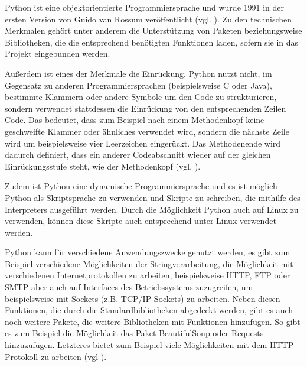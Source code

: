 Python ist eine objektorientierte Programmiersprache und wurde 1991 in der ersten Version von Guido van Rossum veröffentlicht (vgl. \cite{.05.03.2017}). Zu den technischen Merkmalen gehört unter anderem die Unterstützung von Paketen beziehungsweise Bibliotheken, die die entsprechend benötigten Funktionen laden, sofern sie in das Projekt eingebunden werden. 

Außerdem ist eines der Merkmale die Einrückung. Python nutzt nicht, im Gegensatz zu anderen Programmiersprachen (beispielsweise C oder Java), bestimmte Klammern oder andere Symbole um den Code zu strukturieren, sondern verwendet stattdessen die Einrückung von den entsprechenden Zeilen Code. Das bedeutet, dass zum Beispiel nach einem Methodenkopf keine geschweifte Klammer oder ähnliches verwendet wird, sondern die nächste Zeile wird um beispielsweise vier Leerzeichen eingerückt. Das Methodenende wird dadurch definiert, dass ein anderer Codeabschnitt wieder auf der gleichen Einrückungsstufe steht, wie der Methodenkopf (vgl. \cite{.19.08.2013}\cite{.10.03.2017b}). 

Zudem ist Python eine dynamische Programmiersprache und es ist möglich Python als Skriptsprache zu verwenden und Skripte zu schreiben, die mithilfe des Interpreters ausgeführt werden. Durch die Möglichkeit Python auch auf Linux zu verwenden, können diese Skripte auch entsprechend unter Linux verwendet werden.

Python kann für verschiedene Anwendungszwecke genutzt werden, es gibt zum Beispiel verschiedene Möglichkeiten der Stringverarbeitung, die Möglichkeit mit verschiedenen Internetprotokollen zu arbeiten, beispielsweise \ac{HTTP}, \ac{FTP} oder \ac{SMTP} aber auch auf Interfaces des Betriebssystems zuzugreifen, um beispielsweise mit Sockets (z.B. \ac{TCP}/\ac{IP} Sockets) zu arbeiten. Neben diesen Funktionen, die durch die Standardbibliotheken abgedeckt werden, gibt es auch noch weitere Pakete, die weitere Bibliotheken mit Funktionen hinzufügen. So gibt es zum Beispiel die Möglichkeit das Paket BeautifulSoup oder Requests hinzuzufügen. Letzteres bietet zum Beispiel viele Möglichkeiten mit dem \ac{HTTP} Protokoll zu arbeiten (vgl \cite{.m}\cite{.l}\cite{.05.03.2017}). 

